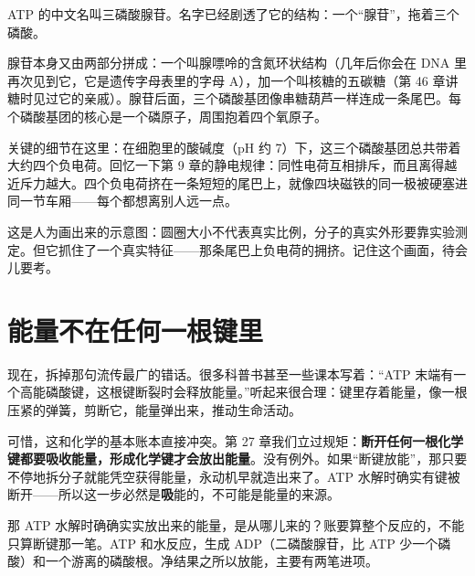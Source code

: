 ATP 的中文名叫三磷酸腺苷。名字已经剧透了它的结构：一个“腺苷”，拖着三个磷酸。

腺苷本身又由两部分拼成：一个叫腺嘌呤的含氮环状结构（几年后你会在 DNA 里再次见到它，它是遗传字母表里的字母 A），加一个叫核糖的五碳糖（第 46 章讲糖时见过它的亲戚）。腺苷后面，三个磷酸基团像串糖葫芦一样连成一条尾巴。每个磷酸基团的核心是一个磷原子，周围抱着四个氧原子。

关键的细节在这里：在细胞里的酸碱度（pH 约 7）下，这三个磷酸基团总共带着大约四个负电荷。回忆一下第 9 章的静电规律：同性电荷互相排斥，而且离得越近斥力越大。四个负电荷挤在一条短短的尾巴上，就像四块磁铁的同一极被硬塞进同一节车厢——每个都想离别人远一点。

\begin{center}
\end{center}

这是人为画出来的示意图：圆圈大小不代表真实比例，分子的真实外形要靠实验测定。但它抓住了一个真实特征——那条尾巴上负电荷的拥挤。记住这个画面，待会儿要考。

\section{能量不在任何一根键里}

现在，拆掉那句流传最广的错话。很多科普书甚至一些课本写着：“ATP 末端有一个高能磷酸键，这根键断裂时会释放能量。”听起来很合理：键里存着能量，像一根压紧的弹簧，剪断它，能量弹出来，推动生命活动。

可惜，这和化学的基本账本直接冲突。第 27 章我们立过规矩：\textbf{断开任何一根化学键都要吸收能量，形成化学键才会放出能量}。没有例外。如果“断键放能”，那只要不停地拆分子就能凭空获得能量，永动机早就造出来了。ATP 水解时确实有键被断开——所以这一步必然是\textbf{吸}能的，不可能是能量的来源。

那 ATP 水解时确确实实放出来的能量，是从哪儿来的？账要算整个反应的，不能只算断键那一笔。ATP 和水反应，生成 ADP（二磷酸腺苷，比 ATP 少一个磷酸）和一个游离的磷酸根。净结果之所以放能，主要有两笔进项。

